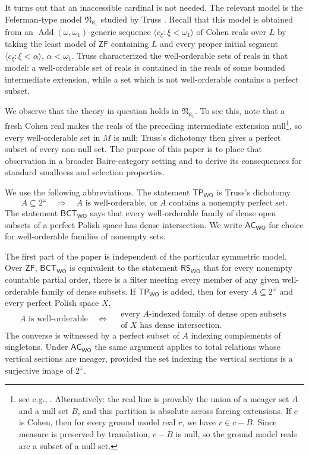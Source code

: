 \documentclass[11pt,reqno]{amsart}
\newcommand{\WO}{\mathsf{WO}}
\newcommand{\Add}{\operatorname{Add}}
\newcommand{\BCTWO}{\mathsf{BCT}_{\WO}}
\newcommand{\RSWO}{\mathsf{RS}_{\WO}}
\newcommand{\TP}{\mathsf{TP}_{\WO}}
\theoremstyle{plain}
\theoremstyle{definition}
\theoremstyle{remark}
\begin{document}
It turns out that an inaccessible cardinal is not needed. The relevant model is the
Feferman-type model $\mathfrak N_{\aleph_1}$ studied by Truss
\cite{Truss1974}.  Recall that this model is obtained from an $\Add(\omega,\omega_1)$-generic sequence
$\langle c_\xi:\xi<\omega_1\rangle$ of Cohen reals over $L$ by taking
the least model of $\mathsf{ZF}$ containing $L$ and every proper initial
segment $\langle c_\xi:\xi<\alpha\rangle$, $\alpha<\omega_1$.  Truss characterized the well-orderable sets of reals in that model: a well-orderable set of reals is contained
in the reals of some bounded intermediate extension, while a set which is not well-orderable contains a perfect subset.

We observe that the theory in question holds in $\mathfrak N_{\aleph_1}$. To see this, note that a fresh Cohen real makes the
reals of the preceding intermediate extension null\footnote{see e.g., \cite{Cardona2020}. Alternatively: the real line is provably the union of a meager set $A$ and a null set $B$, and this partition is absolute across forcing extensions. If $c$ is Cohen, then for every ground model real $r$, we have $r\in c-B$. Since measure is preserved by translation, $c-B$ is null, so the ground model reals are a subset of a null set.}, so every well-orderable set in $M$ is null; Truss's dichotomy then gives a perfect subset of every non-null set.  The purpose of this paper is to place that observation in a broader Baire-category setting and to derive its consequences for standard smallness and selection properties.

We use the following abbreviations.  The statement $\TP$ is Truss's
dichotomy
\[
 A\subseteq2^\omega\quad\Longrightarrow\quad
 A\text{ is well-orderable, or }A\text{ contains a nonempty perfect set}.
\]
The statement $\BCTWO$ says that every well-orderable family of dense open subsets of a perfect Polish space has dense intersection.  We write $\mathsf{AC}_{\WO}$ for choice for well-orderable families of nonempty sets. 

The first part of the paper is independent of the particular symmetric model.  Over $\mathsf{ZF}$, $\BCTWO$ is equivalent to the statement $\RSWO$ that for every nonempty countable partial order,
there is a filter meeting every member of any given well-orderable family of dense subsets.  If $\TP$ is added, then for every
$A\subseteq2^\omega$ and every perfect Polish space $X$,
\begin{equation}\label{eq:intro-baire}
 A\text{ is well-orderable}
 \quad\Longleftrightarrow\quad
 \begin{gathered}
  \text{every $A$-indexed family of dense open subsets}\\
  \text{of $X$ has dense intersection.}
 \end{gathered}
\end{equation}
The converse is witnessed by a perfect subset of $A$ indexing complements of singletons.  Under $\mathsf{AC}_{\WO}$ the same argument applies to total relations whose vertical sections are meager, provided the set indexing the vertical sections is a surjective image of $2^\omega$.
\end{document}
